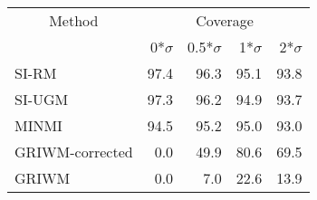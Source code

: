 
\begin{tabular}{lrrrr}
\toprule
\multicolumn{1}{c}{Method} & \multicolumn{4}{c}{Coverage} \\
 & 0*$\sigma$ & 0.5*$\sigma$ & 1*$\sigma$ & 2*$\sigma$\\
\midrule
SI-RM & 97.4 & 96.3 & 95.1 & 93.8\\
SI-UGM & 97.3 & 96.2 & 94.9 & 93.7\\
MINMI & 94.5 & 95.2 & 95.0 & 93.0\\
GRIWM-corrected & 0.0 & 49.9 & 80.6 & 69.5\\
GRIWM & 0.0 & 7.0 & 22.6 & 13.9\\
\bottomrule
\end{tabular}
